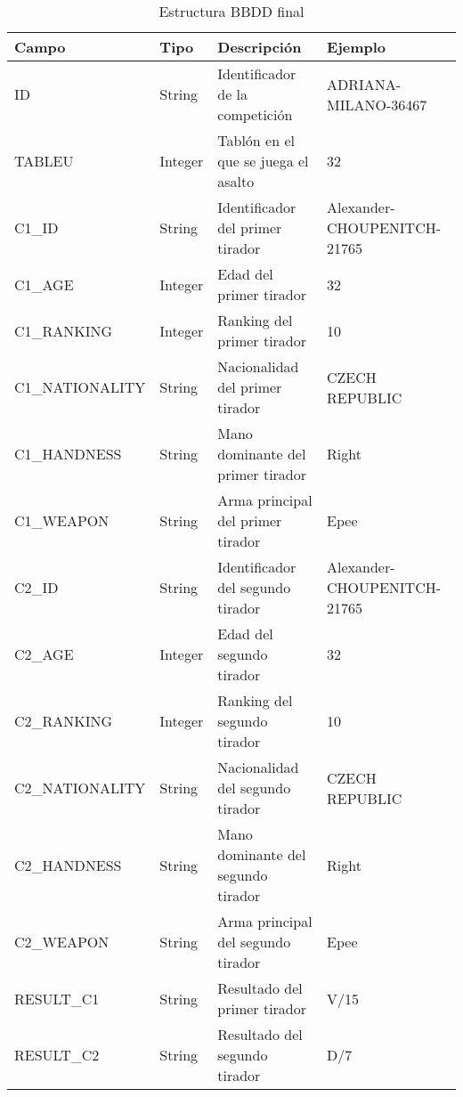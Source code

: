 \begin{table}[]
  \centering
  \caption{Estructura BBDD final}
  \label{Estructura BBDD final}
  \begin{tabular}{|llll|}
    \hline \rowcolor[HTML]{C0C0C0}
    Campo & Tipo & Descripción & Ejemplo \\ \hline
    ID & String & Identificador de la competición & ADRIANA-MILANO-36467 \\ \hline
    TABLEU & Integer & Tablón en el que se juega el asalto & 32 \\ \hline

    \rowcolor[HTML]{969696}
    C1\_ID & String & Identificador del primer tirador & Alexander-CHOUPENITCH-21765 \\ \hline
    \rowcolor[HTML]{969696}
    C1\_AGE & Integer & Edad del primer tirador & 32 \\ \hline
    \rowcolor[HTML]{969696}
    C1\_RANKING & Integer & Ranking del primer tirador & 10 \\ \hline
    \rowcolor[HTML]{969696}
    C1\_NATIONALITY & String & Nacionalidad del primer tirador & CZECH REPUBLIC \\ \hline
    \rowcolor[HTML]{969696}
    C1\_HANDNESS & String & Mano dominante del primer tirador & Right \\ \hline
    \rowcolor[HTML]{969696}
    C1\_WEAPON & String & Arma principal del primer tirador & Epee \\ \hline

    \rowcolor[HTML]{636363}
    C2\_ID & String & Identificador del segundo tirador & Alexander-CHOUPENITCH-21765 \\ \hline
    \rowcolor[HTML]{636363}
    C2\_AGE & Integer & Edad del segundo tirador & 32 \\ \hline
    \rowcolor[HTML]{636363}
    C2\_RANKING & Integer & Ranking del segundo tirador & 10 \\ \hline
    \rowcolor[HTML]{636363}
    C2\_NATIONALITY & String & Nacionalidad del segundo tirador & CZECH REPUBLIC \\ \hline
    \rowcolor[HTML]{636363}
    C2\_HANDNESS & String & Mano dominante del segundo tirador & Right \\ \hline
    \rowcolor[HTML]{636363}
    C2\_WEAPON & String & Arma principal del segundo tirador & Epee \\ \hline

    \rowcolor[HTML]{969696}
    RESULT\_C1 & String & Resultado del primer tirador & V/15 \\ \hline
    \rowcolor[HTML]{636363}
    RESULT\_C2 & String & Resultado del segundo tirador & D/7 \\ \hline

  \end{tabular}
\end{table}

